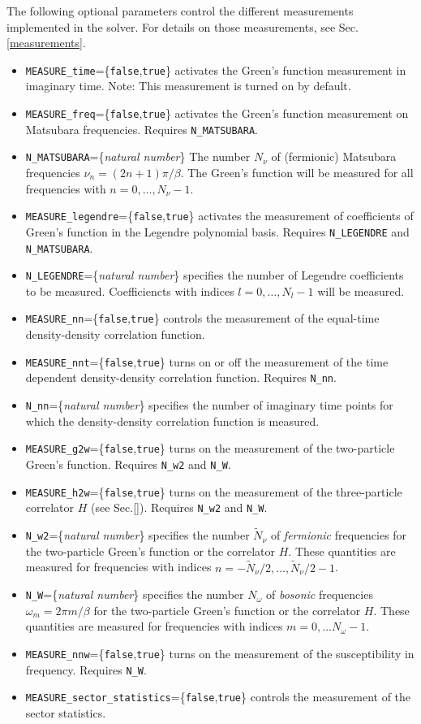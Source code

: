 \documentclass[aps,prb,floatfix,superscriptaddress,twocolumn,notitlepage]{revtex4-1}
\begin{document}
The following optional parameters control the different measurements implemented in the solver. For details on those measurements, see Sec. \ref{measurements}.
\begin{itemize}
\item \verb#MEASURE_time#=\{\verb#false#,\verb#true#\} activates the Green's function measurement in imaginary time. Note: This measurement is turned on by default.
\item \verb#MEASURE_freq#=\{\verb#false#,\verb#true#\} activates the Green's function measurement on Matsubara frequencies. Requires \verb#N_MATSUBARA#.
\item \verb#N_MATSUBARA#=\{\emph{natural number}\} The number $N_{\nu}$ of (fermionic) Matsubara frequencies $\nu_{n}=(2n+1)\pi/\beta$. The Green's function will be measured for all frequencies with $n=0,\ldots,N_{\nu}-1$.
\item \verb#MEASURE_legendre#=\{\verb#false#,\verb#true#\} activates the measurement of coefficients of Green's function in the Legendre polynomial basis. Requires \verb#N_LEGENDRE# and \verb#N_MATSUBARA#.
\item \verb#N_LEGENDRE#=\{\emph{natural number}\} specifies the number of Legendre coefficients to be measured. Coefficiencts with indices $l=0,\ldots,N_{l}-1$ will be measured.
\item \verb#MEASURE_nn#=\{\verb#false#,\verb#true#\} controls the measurement of the equal-time density-density correlation function.
\item \verb#MEASURE_nnt#=\{\verb#false#,\verb#true#\} turns on or off the measurement of the time dependent density-density correlation function. Requires \verb#N_nn#.
\item \verb#N_nn#=\{\emph{natural number}\} specifies the number of imaginary time points for which the density-density correlation function is measured.
\item \verb#MEASURE_g2w#=\{\verb#false#,\verb#true#\} turns on the measurement of the two-particle Green's function. Requires \verb#N_w2# and \verb#N_W#.
\item \verb#MEASURE_h2w#=\{\verb#false#,\verb#true#\} turns on the measurement of the three-particle correlator $H$ (see Sec.\ref{}). Requires \verb#N_w2# and \verb#N_W#.
\item \verb#N_w2#=\{\emph{natural number}\} specifies the number $\tilde{N}_{\nu}$ of \emph{fermionic} frequencies for the two-particle Green's function or the correlator $H$. These quantities are measured for frequencies with indices $n=-\tilde{N}_{\nu}/2,\ldots,\tilde{N}_{\nu}/2-1$.
\item \verb#N_W#=\{\emph{natural number}\} specifies the number $N_{\omega}$ of \emph{bosonic} frequencies $\omega_{m}=2\pi m/\beta$ for the two-particle Green's function or the correlator $H$. These quantities are measured for frequencies with indices $m=0,\ldots N_{\omega}-1$.
\item \verb#MEASURE_nnw#=\{\verb#false#,\verb#true#\} turns on the measurement of the susceptibility in frequency. Requires \verb#N_W#.
\item \verb#MEASURE_sector_statistics#=\{\verb#false#,\verb#true#\} controls the measurement of the sector statistics.


\end{itemize}
\end{document}
